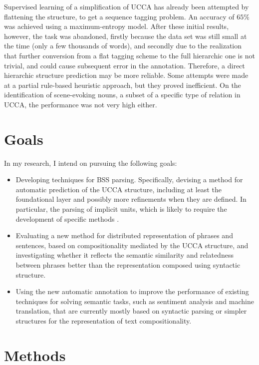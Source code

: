 \documentclass[11pt]{article}
\begin{document}
Supervised learning of a simplification of UCCA has already been attempted by
flattening the structure, to get a sequence tagging
problem\cite{beka2013thesis}. An accuracy of $65\%$ was achieved using a
maximum-entropy model. After these initial results, however, the task was
abandoned, firstly because the data set was still small at the time (only a few
thousands of words), and secondly due to the realization that further
conversion from a flat tagging scheme to the full hierarchic one is not
trivial, and could cause subsequent error in the annotation. Therefore, a
direct hierarchic structure prediction may be more reliable. Some attempts were
made at a partial rule-based heuristic approach, but they proved inefficient.
On the identification of scene-evoking nouns, a subset of a specific type of
relation in UCCA, the performance was not very high either.



\section{Goals}\label{sec:goals}

In my research, I intend on pursuing the following goals:

\begin{itemize}
  \item Developing techniques for BSS parsing.
    Specifically, devising a method for automatic prediction of the UCCA
    structure, including at least the foundational layer and possibly more
    refinements when they are defined.
    In particular, the parsing of implicit units, which is likely to require
    the development of specific methods \cite{roth2015inducing}.
  \item Evaluating a new method for distributed representation of phrases
    and sentences, based on compositionality mediated by the UCCA structure,
    and investigating whether it reflects the semantic similarity and relatedness
    between phrases better than the representation composed using syntactic structure.
  \item Using the new automatic annotation to improve the performance of
    existing techniques for solving semantic tasks, such as sentiment analysis
    and machine translation, that are currently mostly based on syntactic
    parsing or simpler structures for the representation of text
    compositionality.
\end{itemize}


\section{Methods}\label{sec:methods}
\end{document}
